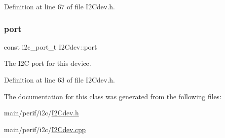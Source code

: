 Definition at line 67 of file I2\+Cdev.\+h.

\mbox{\label{classI2Cdev_a1d1e63732aa9f50369172b27a034129c}} 
\subsubsection{\texorpdfstring{port}{port}}
{\footnotesize\ttfamily const i2c\+\_\+port\+\_\+t I2\+Cdev\+::port\hspace{0.3cm}{\ttfamily [protected]}}

The I2C port for this device. 

Definition at line 63 of file I2\+Cdev.\+h.



The documentation for this class was generated from the following files\+:\begin{DoxyCompactItemize}
\item 
main/perif/i2c/\mbox{\hyperlink{I2Cdev_8h}{I2\+Cdev.\+h}}\item 
main/perif/i2c/\mbox{\hyperlink{I2Cdev_8cpp}{I2\+Cdev.\+cpp}}\end{DoxyCompactItemize}
